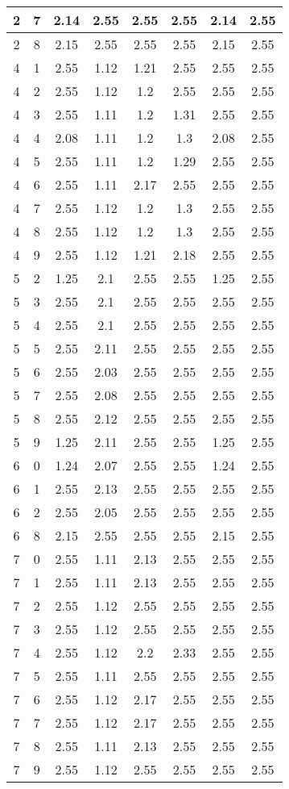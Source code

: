 \begin{longtable}{|c|c||c||c|c|c||c|c|}
	2 & 7 & 2.14 & 2.55 & 2.55 & 2.55 & 2.14 & 2.55 \\ \hline
	2 & 8 & 2.15 & 2.55 & 2.55 & 2.55 & 2.15 & 2.55 \\ \hline
	4 & 1 & 2.55 & 1.12 & 1.21 & 2.55 & 2.55 & 2.55 \\ \hline
	4 & 2 & 2.55 & 1.12 & 1.2 & 2.55 & 2.55 & 2.55 \\ \hline
	4 & 3 & 2.55 & 1.11 & 1.2 & 1.31 & 2.55 & 2.55 \\ \hline
	4 & 4 & 2.08 & 1.11 & 1.2 & 1.3 & 2.08 & 2.55 \\ \hline
	4 & 5 & 2.55 & 1.11 & 1.2 & 1.29 & 2.55 & 2.55 \\ \hline
	4 & 6 & 2.55 & 1.11 & 2.17 & 2.55 & 2.55 & 2.55 \\ \hline
	4 & 7 & 2.55 & 1.12 & 1.2 & 1.3 & 2.55 & 2.55 \\ \hline
	4 & 8 & 2.55 & 1.12 & 1.2 & 1.3 & 2.55 & 2.55 \\ \hline
	4 & 9 & 2.55 & 1.12 & 1.21 & 2.18 & 2.55 & 2.55 \\ \hline
	5 & 2 & 1.25 & 2.1 & 2.55 & 2.55 & 1.25 & 2.55 \\ \hline
	5 & 3 & 2.55 & 2.1 & 2.55 & 2.55 & 2.55 & 2.55 \\ \hline
	5 & 4 & 2.55 & 2.1 & 2.55 & 2.55 & 2.55 & 2.55 \\ \hline
	5 & 5 & 2.55 & 2.11 & 2.55 & 2.55 & 2.55 & 2.55 \\ \hline
	5 & 6 & 2.55 & 2.03 & 2.55 & 2.55 & 2.55 & 2.55 \\ \hline
	5 & 7 & 2.55 & 2.08 & 2.55 & 2.55 & 2.55 & 2.55 \\ \hline
	5 & 8 & 2.55 & 2.12 & 2.55 & 2.55 & 2.55 & 2.55 \\ \hline
	5 & 9 & 1.25 & 2.11 & 2.55 & 2.55 & 1.25 & 2.55 \\ \hline
	6 & 0 & 1.24 & 2.07 & 2.55 & 2.55 & 1.24 & 2.55 \\ \hline
	6 & 1 & 2.55 & 2.13 & 2.55 & 2.55 & 2.55 & 2.55 \\ \hline
	6 & 2 & 2.55 & 2.05 & 2.55 & 2.55 & 2.55 & 2.55 \\ \hline
	6 & 8 & 2.15 & 2.55 & 2.55 & 2.55 & 2.15 & 2.55 \\ \hline
	7 & 0 & 2.55 & 1.11 & 2.13 & 2.55 & 2.55 & 2.55 \\ \hline
	7 & 1 & 2.55 & 1.11 & 2.13 & 2.55 & 2.55 & 2.55 \\ \hline
	7 & 2 & 2.55 & 1.12 & 2.55 & 2.55 & 2.55 & 2.55 \\ \hline
	7 & 3 & 2.55 & 1.12 & 2.55 & 2.55 & 2.55 & 2.55 \\ \hline
	7 & 4 & 2.55 & 1.12 & 2.2 & 2.33 & 2.55 & 2.55 \\ \hline
	7 & 5 & 2.55 & 1.11 & 2.55 & 2.55 & 2.55 & 2.55 \\ \hline
	7 & 6 & 2.55 & 1.12 & 2.17 & 2.55 & 2.55 & 2.55 \\ \hline
	7 & 7 & 2.55 & 1.12 & 2.17 & 2.55 & 2.55 & 2.55 \\ \hline
	7 & 8 & 2.55 & 1.11 & 2.13 & 2.55 & 2.55 & 2.55 \\ \hline
	7 & 9 & 2.55 & 1.12 & 2.55 & 2.55 & 2.55 & 2.55 \\ \hline
\end{longtable}
